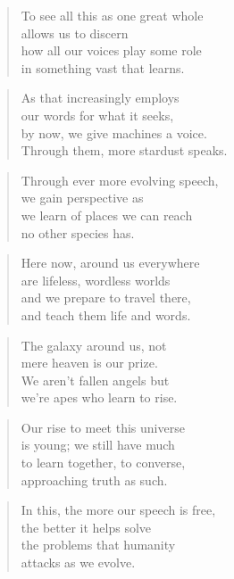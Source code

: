 \documentclass[10pt,a4paper]{article}
\begin{document}
\begin{multicols}{2}
\begin{verse}
To see all this as one great whole\\
allows us to discern\\
how all our voices play some role\\
in something vast that learns.
\end{verse}

\begin{verse}
As that increasingly employs\\
our words for what it seeks,\\
by now, we give machines a voice.\\
Through them, more stardust speaks.
\end{verse}

\begin{verse}
Through ever more evolving speech,\\
we gain perspective as\\
we learn of places we can reach\\
no other species has.
\end{verse}

\begin{verse}
Here now, around us everywhere\\
are lifeless, wordless worlds\\
and we prepare to travel there,\\
and teach them life and words.
\end{verse}

\begin{verse}
The galaxy around us, not\\
mere heaven is our prize.\\
We aren’t fallen angels but\\
we’re apes who learn to rise.
\end{verse}

\begin{verse}
Our rise to meet this universe\\
is young; we still have much\\
to learn together, to converse,\\
approaching truth as such.
\end{verse}

\begin{verse}
In this, the more our speech is free,\\
the better it helps solve\\
the problems that humanity\\
attacks as we evolve.
\end{verse}


\end{multicols}
\end{document}
